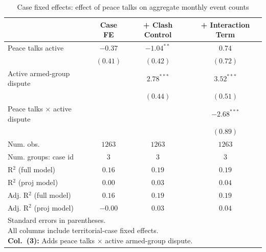 
\begin{table}
\caption{Case fixed effects: effect of peace talks on aggregate monthly event counts}
\begin{center}
\begin{tabular}{l c c c}
\toprule
 & Case FE & + Clash Control & + Interaction Term \\
\midrule
Peace talks active           & $-0.37$  & $-1.04^{**}$ & $0.74$        \\
                             & $(0.41)$ & $(0.42)$     & $(0.72)$      \\
Active armed-group dispute   &          & $2.78^{***}$ & $3.52^{***}$  \\
                             &          & $(0.44)$     & $(0.51)$      \\
Peace talks × active dispute &          &              & $-2.68^{***}$ \\
                             &          &              & $(0.89)$      \\
\midrule
Num. obs.                    & $1263$   & $1263$       & $1263$        \\
Num. groups: case id        & $3$      & $3$          & $3$           \\
R$^2$ (full model)           & $0.16$   & $0.19$       & $0.19$        \\
R$^2$ (proj model)           & $0.00$   & $0.03$       & $0.04$        \\
Adj. R$^2$ (full model)      & $0.16$   & $0.19$       & $0.19$        \\
Adj. R$^2$ (proj model)      & $-0.00$  & $0.03$       & $0.04$        \\
\bottomrule
\multicolumn{4}{l}{\scriptsize{\parbox{\linewidth}{Standard errors in parentheses.\\[0.35em] All columns include territorial-case fixed effects.\\[0.35em] \textbf{Col.~(3):} Adds peace talks $\times$ active armed-group dispute.}}}
\end{tabular}
\label{tab:results_case_fe}
\end{center}
\end{table}
